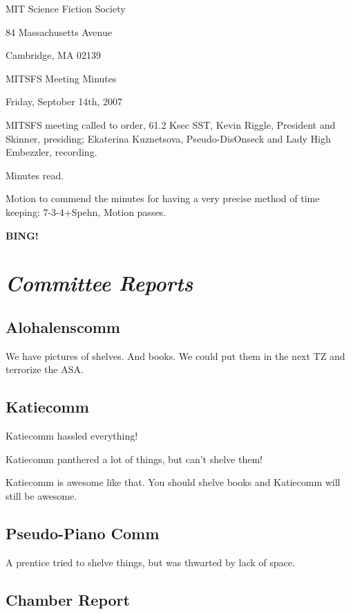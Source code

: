 \documentclass[10pt]{article}
\newcommand{\bing}{{\bf BING!} }
\newcommand{\goto}[1]{\bing \vskip 12pt \section*{{\em{#1}}}}
\begin{document}
\begin{center}

MIT Science Fiction Society

84 Massachusetts Avenue

Cambridge, MA 02139

\vspace{12pt}

MITSFS Meeting Minutes

Friday, Septober 14th, 2007

\end{center}

\vspace{18pt}

\setlength{\parskip}{6pt}

\noindent
MITSFS meeting called to order, 61.2 Ksec SST,
Kevin Riggle, President and Skinner, presiding; Ekaterina Kuznetsova, Pseudo-DisOnseck and Lady High Embezzler, recording.

Minutes read.

Motion to commend the minutes for having a very precise method of time keeping: 7-3-4+Spehn, Motion passes.

\goto{Committee Reports}

\subsection*{Alohalenscomm}

We have pictures of shelves. And books. We could put them in the next TZ and terrorize the ASA. 

\subsection*{Katiecomm}

Katiecomm hassled everything! 

Katiecomm panthered a lot of things, but can't shelve them! 

Katiecomm is awesome like that. You should shelve books and Katiecomm will still be awesome.

\subsection*{Pseudo-Piano Comm}

A prentice tried to shelve things, but was thwarted by lack of space.

\subsection*{Chamber Report}
\end{document}
